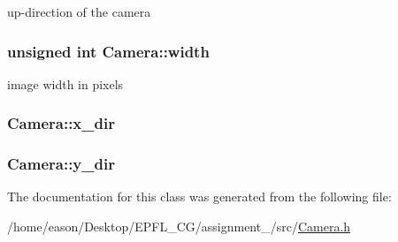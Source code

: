 up-\/direction of the camera 

\subsubsection[{\texorpdfstring{width}{width}}]{\setlength{\rightskip}{0pt plus 5cm}unsigned int Camera\+::width}\hypertarget{classCamera_aa18f0bf8b6e8cb661643d980a4484ac0}{}\label{classCamera_aa18f0bf8b6e8cb661643d980a4484ac0}


image width in pixels 

\subsubsection[{\texorpdfstring{x\+\_\+dir}{x_dir}}]{ Camera\+::x\+\_\+dir\hspace{0.3cm}{\ttfamily [private]}}\hypertarget{classCamera_aa7766618e7cc508ff0a825559e014d31}{}\label{classCamera_aa7766618e7cc508ff0a825559e014d31}
\subsubsection[{\texorpdfstring{y\+\_\+dir}{y_dir}}]{ Camera\+::y\+\_\+dir\hspace{0.3cm}{\ttfamily [private]}}\hypertarget{classCamera_a55166ac03aba3b694e9ef2df29be58f0}{}\label{classCamera_a55166ac03aba3b694e9ef2df29be58f0}


The documentation for this class was generated from the following file\+:\begin{DoxyCompactItemize}
\item 
/home/eason/\+Desktop/\+E\+P\+F\+L\+\_\+\+C\+G/assignment\+\_/src/\hyperlink{Camera_8h}{Camera.\+h}\end{DoxyCompactItemize}
